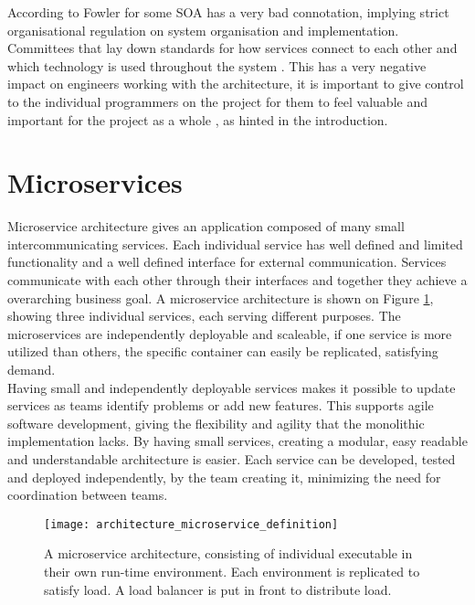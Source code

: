 According to Fowler for some SOA has a very bad connotation, implying strict organisational regulation on system organisation and implementation. Committees that lay down standards for how services connect to each other and which technology is used throughout the system \cite[t.13:12]{fowler2014microservicesoamonolith}. This has a very negative impact on engineers working with the architecture, it is important to give control to the individual programmers on the project for them to feel valuable and important for the project as a whole \cite[p.~16]{newman2015microservices}, as hinted in the introduction. 

\section{Microservices}
\label{sec:microservices}
Microservice architecture gives an application composed of many small intercommunicating services. Each individual service has well defined and limited functionality and a well defined interface for external communication. Services communicate with each other through their interfaces and together they achieve a overarching business goal\cite[p.~2]{newman2015microservices}. A microservice architecture is shown on Figure \ref{fig:architecture_microservice_definition}, showing three individual services, each serving different purposes. The microservices are independently deployable and scaleable, if one service is more utilized than others, the specific container can easily be replicated, satisfying demand. \\

Having small and independently deployable services makes it possible to update services as teams identify problems or add new features. This supports agile software development, giving the flexibility and agility that the monolithic implementation lacks. By having small services, creating a modular, easy readable and understandable architecture is easier. Each service can be developed, tested and deployed independently, by the team creating it, minimizing the need for coordination between teams\cite{kniberg2014spotify}.

\begin{figure}[!htb]
\begin{center}
  \texttt{[image: architecture\_microservice\_definition]}  
  \caption{A microservice architecture, consisting of individual executable in their own run-time environment. Each environment is replicated to satisfy load. A load balancer is put in front to distribute load.}
  \label{fig:architecture_microservice_definition}
  \end{center}
\end{figure}

